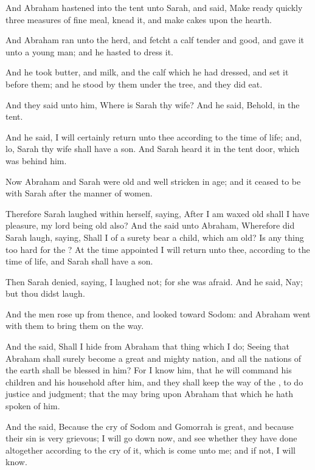 \verse And Abraham hastened into the tent unto Sarah, and said, Make ready quickly three measures of fine meal, knead it, and make cakes upon the hearth.

\verse And Abraham ran unto the herd, and fetcht a calf tender and good, and gave it unto a young man; and he hasted to dress it.

\verse And he took butter, and milk, and the calf which he had dressed, and set it before them; and he stood by them under the tree, and they did eat.

\verse And they said unto him, Where is Sarah thy wife? And he said, Behold, in the tent.

\verse And he said, I will certainly return unto thee according to the time of life; and, lo, Sarah thy wife shall have a son. And Sarah heard it in the tent door, which was behind him.

\verse Now Abraham and Sarah were old and well stricken in age; and it ceased to be with Sarah after the manner of women.

\verse Therefore Sarah laughed within herself, saying, After I am waxed old shall I have pleasure, my lord being old also?  \verse And the \LORD said unto Abraham, Wherefore did Sarah laugh, saying, Shall I of a surety bear a child, which am old?  \verse Is any thing too hard for the \LORD? At the time appointed I will return unto thee, according to the time of life, and Sarah shall have a son.

\verse Then Sarah denied, saying, I laughed not; for she was afraid.  And he said, Nay; but thou didst laugh.

\verse And the men rose up from thence, and looked toward Sodom: and Abraham went with them to bring them on the way.

\verse And the \LORD said, Shall I hide from Abraham that thing which I do; \verse Seeing that Abraham shall surely become a great and mighty nation, and all the nations of the earth shall be blessed in him?  \verse For I know him, that he will command his children and his household after him, and they shall keep the way of the \LORD, to do justice and judgment; that the \LORD may bring upon Abraham that which he hath spoken of him.

\verse And the \LORD said, Because the cry of Sodom and Gomorrah is great, and because their sin is very grievous; \verse I will go down now, and see whether they have done altogether according to the cry of it, which is come unto me; and if not, I will know.

